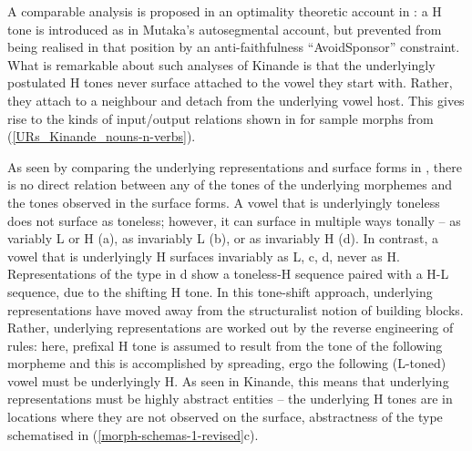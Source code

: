 A comparable analysis is proposed in an optimality theoretic account in \citet{Akinlabi+:2001}: a H tone is introduced as in Mutaka's autosegmental account, but prevented from being realised in that position by an anti-faithfulness ``{\sc AvoidSponsor}'' constraint. What is remarkable about such analyses of Kinande is that the underlyingly postulated H tones never surface attached to the vowel they start with. Rather, they attach to a neighbour and detach from the underlying vowel host. This gives rise to  the kinds of input/output relations shown in  for sample morphs from (\ref{URs_Kinande_nouns-n-verbs}).

As  seen by comparing the underlying representations and surface forms in , there is no direct relation between any of the tones of the underlying morphemes and the tones observed in  the surface forms. A vowel that is underlyingly toneless does not surface as toneless; however, it can surface in multiple ways tonally -- as variably L or H (a), as invariably L (b), or as invariably H (d). In contrast, a vowel that is underlyingly H surfaces  invariably  as L, c, d, never as H. Representations of the type in d show  a toneless-H sequence paired with a H-L sequence, due to the shifting H tone. In this tone-shift approach, underlying representations have moved away from the structuralist notion of building blocks. Rather, underlying representations are  worked out by the reverse engineering of rules: here, prefixal H tone is assumed to result from the tone of the following morpheme and this is accomplished by spreading, ergo the following (L-toned) vowel must be underlyingly H. As seen in Kinande, this means that underlying representations must be highly abstract entities -- the underlying H tones are in locations where they are not observed on the surface, abstractness of the type schematised in (\ref{morph-schemas-1-revised}c).


